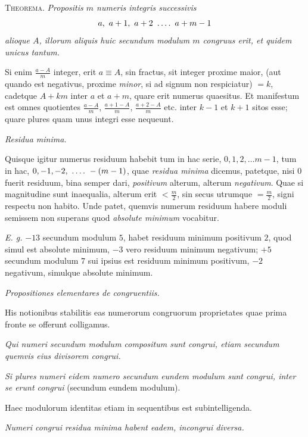 
\textsc{Theorema.} \emph{Propositis $m$ numeris integris successivis}
\[
a,\ a+1,\ a+2\ \GaussFourDots\ a+m-1
\]
\emph{alioque $A$, illorum aliquis huic secundum modulum $m$ congruus erit, et quidem unicus tantum.}

Si enim $\frac{a-A}{m}$ integer, erit $a\equiv A$, sin fractus, sit integer proxime maior, (aut quando est negativus, proxime \emph{minor}, si ad signum non respiciatur) $=k$, cadetque $A+km$ inter $a$ et $a+m$, quare erit numerus quaesitus. Et manifestum est omnes quotientes $\frac{a-A}{m}$, $\frac{a+1-A}{m}$, $\frac{a+2-A}{m}$ etc. inter $k-1$ et $k+1$ sitos esse; quare plures quam unus integri esse nequeunt.

\begin{center}\emph{Residua minima.}\end{center}

Quisque igitur numerus residuum habebit tum in hac serie, $0, 1, 2,\ldots m-1$, tum in hac, $0, -1, -2,\ \GaussFourDots\ -(m-1)$, quae \emph{residua minima} dicemus, patetque, nisi $0$ fuerit residuum, bina semper dari, \emph{positivum} alterum, alterum \emph{negativum}. Quae si magnitudine sunt inaequalia, alterum erit $<\frac{m}{2}$, sin secus utrumque $=\frac{m}{2}$, signi respectu non habito. Unde patet, quemvis numerum residuum habere moduli semissem non superans quod \emph{absolute minimum} vocabitur.

\emph{E. g.} $-13$ secundum modulum $5$, habet residuum minimum positivum $2$, quod simul est absolute minimum, $-3$ vero residuum minimum negativum; $+5$ secundum modulum $7$ sui ipsius est residuum minimum positivum, $-2$ negativum, simulque absolute minimum.

\begin{center}\emph{Propositiones elementares de congruentiis.}\end{center}

His notionibus stabilitis eas numerorum congruorum proprietates quae prima fronte se offerunt colligamus.

\emph{Qui numeri secundum modulum compositum sunt congrui, etiam secundum quemvis eius divisorem congrui.}

\emph{Si plures numeri eidem numero secundum eundem modulum sunt congrui, inter se erunt congrui} (secundum eundem modulum).

Haec modulorum identitas etiam in sequentibus est subintelligenda.

\emph{Numeri congrui residua minima habent eadem, incongrui diversa.}

